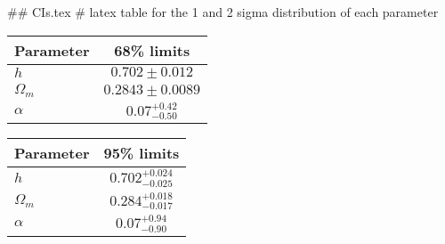 ## CIs.tex
# latex table for the 1 and 2 sigma distribution of each parameter

\begin{tabular} { l  c}
 Parameter &  68\% limits\\
\hline
{\boldmath$h              $} & $0.702\pm 0.012            $\\
{\boldmath$\Omega_m       $} & $0.2843\pm 0.0089          $\\
{\boldmath$\alpha         $} & $0.07^{+0.42}_{-0.50}      $\\
\hline
\end{tabular}

\begin{tabular} { l  c}
 Parameter &  95\% limits\\
\hline
{\boldmath$h              $} & $0.702^{+0.024}_{-0.025}   $\\
{\boldmath$\Omega_m       $} & $0.284^{+0.018}_{-0.017}   $\\
{\boldmath$\alpha         $} & $0.07^{+0.94}_{-0.90}      $\\
\hline
\end{tabular}
